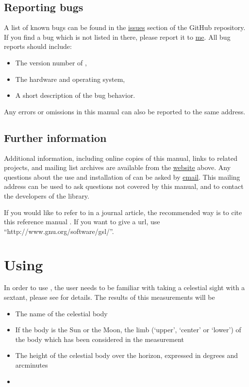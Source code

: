 \documentclass{ol-softwaremanual}
\begin{document}
\subsection{Reporting bugs}

A list of known bugs can be found in the \href{https://github.com/mcastel1/thelemacus/issues}{issues} section of the GitHub repository.
If you find a bug which is not listed in there, please report it to \href{mailto:michele.castellana@gmail.com}{me}. All bug reports should include:
\begin{itemize}
    \item The version number of \thel, 
    \item The hardware and operating system, 
    \item A short description of the bug behavior. 

\end{itemize}

Any errors or omissions in this manual can also be reported to the same address.


\subsection{Further information}


Additional information, including online copies of this manual, links to related projects, and mailing list archives are available from the \href{https://sites.google.com/site/michelecastellana/home}{website}  above.
Any questions about the use and installation of \thel can be asked by \href{mailto:michele.castellana@gmail.com}{email}. This mailing address can be used to ask questions not covered by this manual, and to contact the developers of the library.

If you would like to refer to \thel in a journal article, the recommended way is to cite this reference manual \cite{castellana2024thelemacus-documentation}. If you want to give a url, use “http://www.gnu.org/software/gsl/”.



\section{Using \thel}

In order to use \thel, the user needs to be familiar with taking a celestial sight with a sextant, please see \cite{bowditch2002the} for details. The results of this measurements will be 
\begin{itemize}
\item The name of the celestial body 
\item If the body is the Sun or the Moon, the limb (`upper', `center' or `lower') of the body which has been considered in the measurement
\item The height of the celestial body over the horizon, expressed in degrees and arcminutes
\item 
\end{itemize}



\printacronyms[pages={display=none,seq/use=false}]




\end{document}
